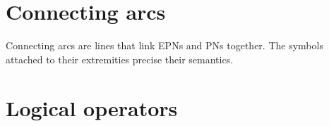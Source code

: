 \section{Connecting arcs}\label{sec:arcs}

Connecting arcs are lines that link EPNs and PNs together. The symbols attached to their extremities precise their semantics.



%










\section{Logical operators}\label{sec:logic}








